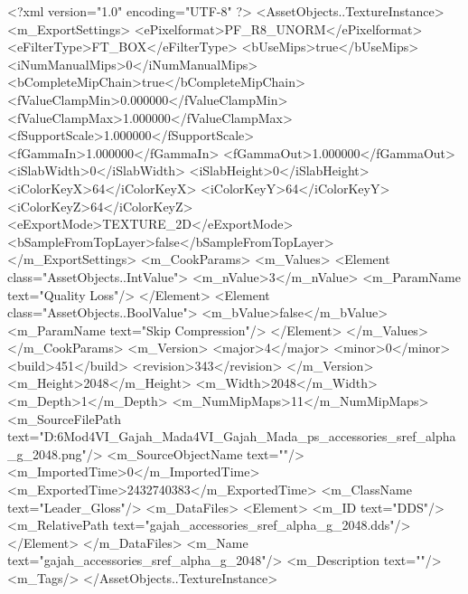 <?xml version="1.0" encoding="UTF-8" ?>
<AssetObjects..TextureInstance>
	<m_ExportSettings>
		<ePixelformat>PF_R8_UNORM</ePixelformat>
		<eFilterType>FT_BOX</eFilterType>
		<bUseMips>true</bUseMips>
		<iNumManualMips>0</iNumManualMips>
		<bCompleteMipChain>true</bCompleteMipChain>
		<fValueClampMin>0.000000</fValueClampMin>
		<fValueClampMax>1.000000</fValueClampMax>
		<fSupportScale>1.000000</fSupportScale>
		<fGammaIn>1.000000</fGammaIn>
		<fGammaOut>1.000000</fGammaOut>
		<iSlabWidth>0</iSlabWidth>
		<iSlabHeight>0</iSlabHeight>
		<iColorKeyX>64</iColorKeyX>
		<iColorKeyY>64</iColorKeyY>
		<iColorKeyZ>64</iColorKeyZ>
		<eExportMode>TEXTURE_2D</eExportMode>
		<bSampleFromTopLayer>false</bSampleFromTopLayer>
	</m_ExportSettings>
	<m_CookParams>
		<m_Values>
			<Element class="AssetObjects..IntValue">
				<m_nValue>3</m_nValue>
				<m_ParamName text="Quality Loss"/>
			</Element>
			<Element class="AssetObjects..BoolValue">
				<m_bValue>false</m_bValue>
				<m_ParamName text="Skip Compression"/>
			</Element>
		</m_Values>
	</m_CookParams>
	<m_Version>
		<major>4</major>
		<minor>0</minor>
		<build>451</build>
		<revision>343</revision>
	</m_Version>
	<m_Height>2048</m_Height>
	<m_Width>2048</m_Width>
	<m_Depth>1</m_Depth>
	<m_NumMipMaps>11</m_NumMipMaps>
	<m_SourceFilePath text="D:\Civ6Mod\gitproject\CV4VI_Gajah_Mada\CV4VI_Gajah_Mada\TexturesWIP\upscaled_ps\gajah_accessories_sref_alpha_g_2048.png"/>
	<m_SourceObjectName text=""/>
	<m_ImportedTime>0</m_ImportedTime>
	<m_ExportedTime>2432740383</m_ExportedTime>
	<m_ClassName text="Leader_Gloss"/>
	<m_DataFiles>
		<Element>
			<m_ID text="DDS"/>
			<m_RelativePath text="gajah_accessories_sref_alpha_g_2048.dds"/>
		</Element>
	</m_DataFiles>
	<m_Name text="gajah_accessories_sref_alpha_g_2048"/>
	<m_Description text=""/>
	<m_Tags/>
</AssetObjects..TextureInstance>

